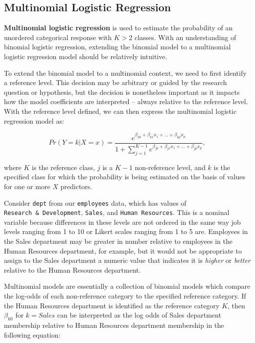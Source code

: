 \documentclass[
]{book}
\begin{document}
\hypertarget{multinomial-logistic-regression}{%
\subsection{Multinomial Logistic Regression}\label{multinomial-logistic-regression}}

\textbf{Multinomial logistic regression} is used to estimate the probability of an unordered categorical response with \(K>2\) classes. With an understanding of binomial logistic regression, extending the binomial model to a multinomial logistic regression model should be relatively intuitive.

To extend the binomial model to a multinomial context, we need to first identify a reference level. This decision may be arbitrary or guided by the research question or hypothesis, but the decision is nonetheless important as it impacts how the model coefficients are interpreted -- always relative to the reference level. With the reference level defined, we can then express the multinomial logistic regression model as:

\[ Pr(Y = k | X = x) = \frac{e^{\beta_{k0} + \beta_{k1} x_1 + ... + \beta_{kp} x_p}}{1+ \displaystyle\sum_{j=1}^{K-1} e^{\beta_{j0} + \beta_{j1} x_1 + ... + \beta_{jp} x_p}}, \]

where \(K\) is the reference class, \(j\) is a \(K-1\) non-reference level, and \(k\) is the specified class for which the probability is being estimated on the basis of values for one or more \(X\) predictors.

Consider \texttt{dept} from our \texttt{employees} data, which has values of \texttt{Research\ \&\ Development}, \texttt{Sales}, and \texttt{Human\ Resources}. This is a nominal variable because differences in these levels are not ordered in the same way job levels ranging from 1 to 10 or Likert scales ranging from 1 to 5 are. Employees in the Sales department may be greater in number relative to employees in the Human Resources department, for example, but it would not be appropriate to assign to the Sales department a numeric value that indicates it is \emph{higher} or \emph{better} relative to the Human Resources department.

Multinomial models are essentially a collection of binomial models which compare the log-odds of each non-reference category to the specified reference category. If the Human Resources department is identified as the reference category \(K\), then \(\beta_{k0}\) for \(k = Sales\) can be interpreted as the log odds of Sales department membership relative to Human Resources department membership in the following equation:
\end{document}
